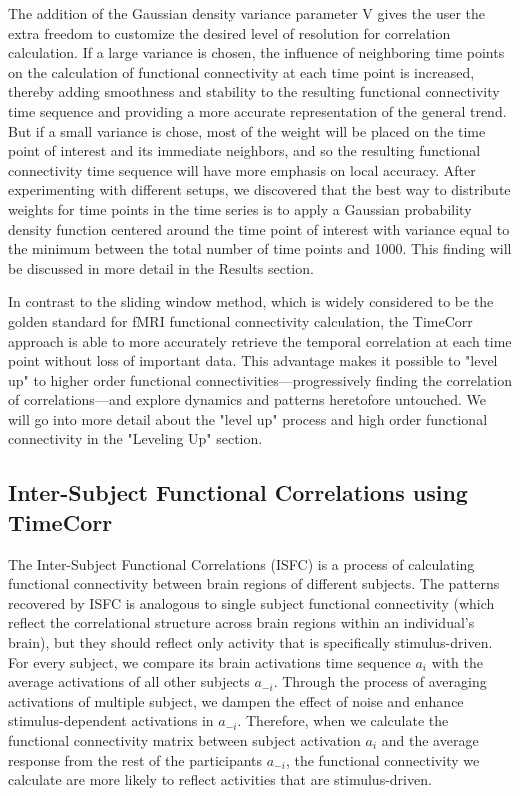 \documentclass[12pt]{article}
\begin{document}
The addition of the Gaussian density variance parameter V gives the user the extra freedom to customize the desired level of resolution for correlation calculation. If a large variance is chosen, the influence of neighboring time points on the calculation of functional connectivity at each time point is increased, thereby adding smoothness and stability to the resulting functional connectivity time sequence and providing a more accurate representation of the general trend. But if a small variance is chose, most of the weight will be placed on the time point of interest and its immediate neighbors, and so the resulting functional connectivity time sequence will have more emphasis on local accuracy. After experimenting with different setups, we discovered that the best way to distribute weights for time points in the time series is to apply a Gaussian probability density function centered around the time point of interest with variance equal to the minimum between the total number of time points and 1000. This finding will be discussed in more detail in the Results section.

In contrast to the sliding window method, which is widely considered to be the golden standard for fMRI functional connectivity calculation, the TimeCorr approach is able to more accurately retrieve the temporal correlation at each time point without loss of important data. This advantage makes it possible to "level up" to higher order functional connectivities---progressively finding the correlation of correlations---and explore dynamics and patterns heretofore untouched. We will go into more detail about the "level up" process and high order functional connectivity in the "Leveling Up" section.

\subsection{Inter-Subject Functional Correlations using TimeCorr}

The Inter-Subject Functional Correlations (ISFC) is a process of calculating functional connectivity between brain regions of different subjects. The patterns recovered by ISFC is analogous to single subject functional connectivity (which reflect the correlational structure across brain regions within an individual's
brain), but they should reflect only activity that is specifically stimulus-driven. For every subject, we compare its brain activations time sequence $a_i$ with the average activations of all other subjects $a_{-i}$. Through the process of averaging activations of multiple subject, we dampen the effect of noise and enhance stimulus-dependent activations in $a_{-i}$. Therefore, when we calculate the functional connectivity matrix between subject activation $a_i$ and the average response from the rest of the participants $a_{-i}$, the functional connectivity we calculate are more likely to reflect activities that are stimulus-driven.
\end{document}
